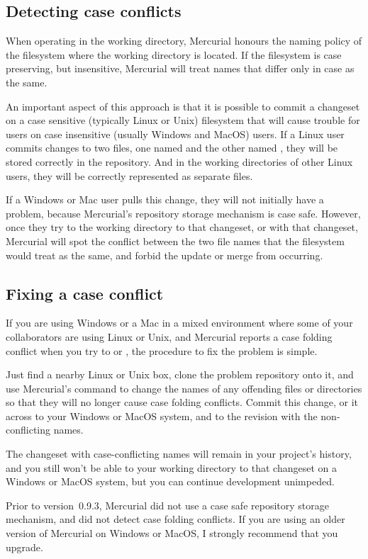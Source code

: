 \subsection{Detecting case conflicts}

When operating in the working directory, Mercurial honours the naming
policy of the filesystem where the working directory is located.  If
the filesystem is case preserving, but insensitive, Mercurial will
treat names that differ only in case as the same.

An important aspect of this approach is that it is possible to commit
a changeset on a case sensitive (typically Linux or Unix) filesystem
that will cause trouble for users on case insensitive (usually Windows
and MacOS) users.  If a Linux user commits changes to two files, one
named  and the other named ,
they will be stored correctly in the repository.  And in the working
directories of other Linux users, they will be correctly represented
as separate files.

If a Windows or Mac user pulls this change, they will not initially
have a problem, because Mercurial's repository storage mechanism is
case safe.  However, once they try to  the working
directory to that changeset, or  with that changeset,
Mercurial will spot the conflict between the two file names that the
filesystem would treat as the same, and forbid the update or merge
from occurring.

\subsection{Fixing a case conflict}

If you are using Windows or a Mac in a mixed environment where some of
your collaborators are using Linux or Unix, and Mercurial reports a
case folding conflict when you try to  or ,
the procedure to fix the problem is simple.

Just find a nearby Linux or Unix box, clone the problem repository
onto it, and use Mercurial's  command to change the
names of any offending files or directories so that they will no
longer cause case folding conflicts.  Commit this change, 
or  it across to your Windows or MacOS system, and
 to the revision with the non-conflicting names.

The changeset with case-conflicting names will remain in your
project's history, and you still won't be able to  your
working directory to that changeset on a Windows or MacOS system, but
you can continue development unimpeded.

\begin{note}
  Prior to version~0.9.3, Mercurial did not use a case safe repository
  storage mechanism, and did not detect case folding conflicts.  If
  you are using an older version of Mercurial on Windows or MacOS, I
  strongly recommend that you upgrade.
\end{note}


